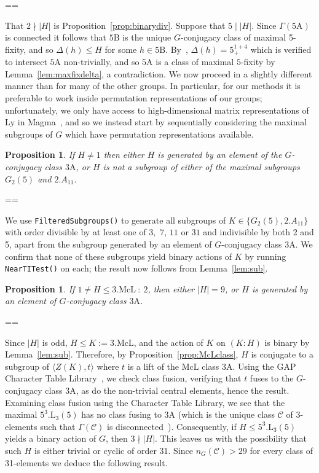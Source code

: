 \documentclass[11pt, a4paper]{amsart}
\makeatletter
\newcommand{\magma}{{\sc Magma}}
\newcommand{\gap}{{\sf GAP}}
\def\cn{\mathord{{\!\:{:}\:\!}}}
\newtheorem{prop}[thm]{Proposition}
\renewcommand{\proofname}{Proof}
\renewenvironment{proof}[1][\proofname]{\par
  \pushQED{\qed}  \normalfont \partopsep=\z@skip \topsep=\z@skip
  \trivlist
  \item[\hskip\labelsep
        \scshape
    #1\@addpunct{.}]\ignorespaces
}{  \popQED\endtrivlist\@endpefalse
}
\makeatother
\begin{document}
\begin{proof}
    That $2\nmid |H|$ is Proposition~\ref{prop:binarydiv}. Suppose that $5\mid |H|$. Since $\Gamma(\mathrm{5A})$ is connected it follows that $\mathrm{5B}$ is the unique $G$-conjugacy class of maximal 5-fixity, and so $\Delta(h)\leq H$ for some $h\in\mathrm{5B}$. By~\cite[Proposition 3.3]{CDP}, $\Delta(h)=5^{1+4}_+$ which is verified to intersect $\mathrm{5A}$ non-trivially, and so $\mathrm{5A}$ is a class of maximal $5$-fixity by Lemma~\ref{lem:maxfixdelta}, a contradiction.
\end{proof}
We now proceed in a slightly different manner than for many of the other groups. In particular, for our methods it is preferable to work inside permutation representations of our groups; unfortunately, we only have access to high-dimensional matrix representations of $\mathrm{Ly}$ in \magma~\cite{magma}, and so we instead start by sequentially considering the maximal subgroups of $G$ which have permutation representations available.
\begin{prop}\label{prop:Lymaxes1}
    If $H\ne 1$ then either $H$ is generated by an element of the $G$-conjugacy class $\mathrm{3A}$, or $H$ is not a subgroup of either of the maximal subgroups $G_2(5)$ and $2.A_{11}$.
\end{prop}
\begin{proof}
    We use {\tt{FilteredSubgroups()}} to generate all subgroups of $K\in\{G_2(5), 2.A_{11}\}$ with order divisible by at least one of $3,$ $7$, $11$ or $31$ and indivisible by both 2 and 5, apart from the subgroup generated by an element of $G$-conjugacy class $\mathrm{3A}$. We confirm that none of these subgroups yield binary actions of $K$ by running {\tt{NearTITest()}} on each; the result now follows from Lemma~\ref{lem:sub}.
\end{proof}

\begin{prop}\label{prop:Lymaxes2}
If $1\ne H\leq 3.\mathrm{McL}\cn2$, then either $|H|=9$, or $H$ is generated by an element of $G$-conjugacy class $\mathrm{3A}$.
\end{prop}
\begin{proof}
        Since $|H|$ is odd, $ H\leq K:=3.\mathrm{McL}$, and the action of $K$ on $(K:H)$ is binary by Lemma~\ref{lem:sub}. Therefore, by Proposition~\ref{prop:McLclass}, $H$ is conjugate to a subgroup of $\langle Z(K),t\rangle$ where $t$ is a lift of the $\mathrm{McL}$ class 3A. Using the \gap~ Character Table Library~\cite{CTblLib1.3.11}, we check class fusion, verifying that $t$ fuses to the $G$-conjugacy class 3A, as do the non-trivial central elements, hence the result. 
                 \end{proof}
Examining class fusion using the Character Table Library, we see that the maximal $5^3.\mathrm{L}_{3}(5)$ has no class fusing to $\mathrm{3A}$ (which is the unique class $\mathcal{C}$ of 3-elements such that $\Gamma(\mathcal{C})$ is disconnected~\cite[Proposition 3.1]{CDP}). Consequently, if $H\leq5^3.\mathrm{L}_{3}(5)$ yields a binary action of $G$, then $3\nmid |H|$. This leaves us with the possibility that such $H$ is either trivial or cyclic of order 31. Since $n_G(\mathcal{C})>29$ for every class of 31-elements we deduce the following result.
\end{document}
